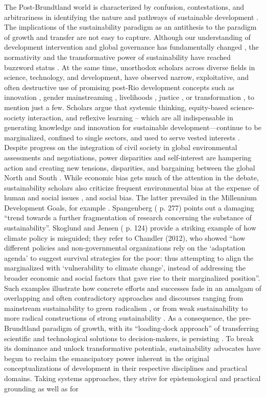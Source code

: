 \documentclass[10pt,a4paper]{article}
\begin{document}
\begin{multicols}{2}
The Post-Brundtland world is characterized by confusion, contestations, and arbitrariness in identifying the nature and pathways of sustainable development \citep{r03, r04, r05}. The implications of the sustainability paradigm as an antithesis to the paradigm of growth and transfer are not easy to capture. Although our understanding of development intervention and global governance has fundamentally changed \citep{r06, r07, r08}, the normativity and the transformative power of sustainability have reached buzzword status \citep{r09}. At the same time, unorthodox scholars across diverse fields in science, technology, and development, have observed narrow, exploitative, and often destructive use of promising post-Rio development concepts such as innovation \citep{r10, r11}, gender mainstreaming \citep{r12}, livelihoods \citep{r13, r14}, justice \citep{r15}, or transformation \citep{r16}, to mention just a few. Scholars argue that systemic thinking, equity-based science-society interaction, and reflexive learning – which are all indispensable in generating knowledge and innovation for sustainable development---continue to be marginalized, confined to single sectors, and used to serve vested interests \citep{r17, r18, r19}. Despite progress on the integration of civil society in global environmental assessments and negotiations, power disparities and self-interest are hampering action and creating new tensions, disparities, and bargaining between the global North and South \citep{r20, r21, r22, r23}. While economic bias gets much of the attention in the debate, sustainability scholars also criticize frequent environmental bias at the expense of human and social issues \citep{r04}, and social bias. The latter prevailed in the Millennium Development Goals, for example \citep{r24}. Spangenberg (\citep{r18} p. 277) points out a damaging ``trend towards a further fragmentation of research concerning the substance of sustainability''. Skoglund and Jensen (\citep{r22} p. 124) provide a striking example of how climate policy is misguided; they refer to Chandler (2012), who showed ``how different policies and non-governmental organizations rely on the `adaptation agenda' to suggest survival strategies for the poor: thus attempting to align the marginalized with `vulnerability to climate change', instead of addressing the broader economic and social factors that gave rise to their marginalized position''. Such examples illustrate how concrete efforts and successes fade in an amalgam of overlapping and often contradictory approaches and discourses ranging from mainstream sustainability to green radicalism \citep{r25}, or from weak sustainability to more radical constructions of strong sustainability \citep{r04, r26, r27}. As a consequence, the pre-Brundtland paradigm of growth, with its ``loading-dock approach'' \citep{r28} of transferring scientific and technological solutions to decision-makers, is persisting \citep{r29, r30}. To break its dominance and unlock transformative potentials, sustainability advocates have begun to reclaim the emancipatory power inherent in the original conceptualizations of development in their respective disciplines and practical domains. Taking systems approaches, they strive for epistemological and practical grounding as well as for 
\end{multicols}
\end{document}
